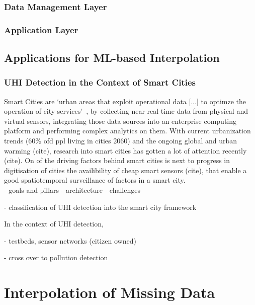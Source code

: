 \subsubsection{Data Management Layer}

\subsubsection{Application Layer}

\subsection{Applications for ML-based Interpolation}
\subsubsection{UHI Detection in the Context of Smart Cities}

Smart Cities are `urban areas that exploit operational data [...] to optimze the operation of city services'~\cite{harrison2010foundations}, by collecting near-real-time data from physical and virtual sensors, integrating those data sources into an enterprise computing platform and performing complex analytics on them. With current urbanization trends (60\% ofd ppl living in cities 2060) and the ongoing global and urban warming (cite), research into smart cities has gotten a lot of attention recently (cite). On of the driving factors behind smart cities is next to progress in digitisation of cities the availibility of cheap smart sensors (cite), that enable a good spatiotemporal surveillance of factors in a smart city.\\
- goals and pillars
- architecture
- challenges

- classification of UHI detection into the smart city framework

In the context of UHI detection,

- testbeds, sensor networks (citizen owned)

- cross over to pollution detection

\section{Interpolation of Missing Data}


